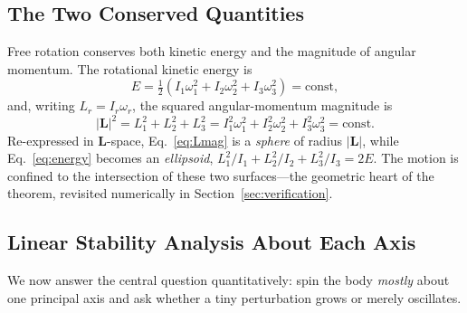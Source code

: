 \documentclass[11pt,letterpaper]{article}
\begin{document}
\subsection{The Two Conserved Quantities}
Free rotation conserves both kinetic energy and the magnitude of angular
momentum. The rotational kinetic energy is
\begin{equation}\label{eq:energy}
E = \tfrac{1}{2}\left(I_1\omega_1^2 + I_2\omega_2^2 + I_3\omega_3^2\right)
  = \text{const},
\end{equation}
and, writing $L_r = I_r\omega_r$, the squared angular-momentum magnitude is
\begin{equation}\label{eq:Lmag}
|\mathbf{L}|^2 = L_1^2 + L_2^2 + L_3^2
  = I_1^2\omega_1^2 + I_2^2\omega_2^2 + I_3^2\omega_3^2 = \text{const}.
\end{equation}
Re-expressed in $\mathbf{L}$-space, Eq.~\eqref{eq:Lmag} is a \emph{sphere} of
radius $|\mathbf{L}|$, while Eq.~\eqref{eq:energy} becomes an \emph{ellipsoid},
$L_1^2/I_1 + L_2^2/I_2 + L_3^2/I_3 = 2E$. The motion is confined to the
intersection of these two surfaces---the geometric heart of the theorem,
revisited numerically in Section~\ref{sec:verification}.

\subsection{Linear Stability Analysis About Each Axis}
We now answer the central question quantitatively: spin the body \emph{mostly}
about one principal axis and ask whether a tiny perturbation grows or merely
oscillates.
\end{document}
